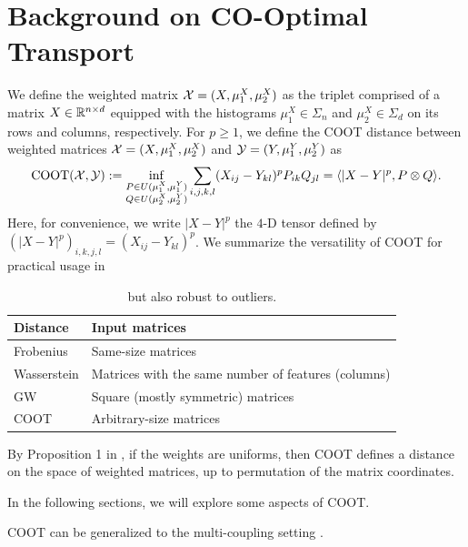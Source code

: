 \section{Background on CO-Optimal Transport}

We define the weighted matrix $\mathcal X = (X, \mu_1^X, \mu_2^X)$
as the triplet comprised of a matrix $X \in \mathbb R^{n \times d}$
equipped with the histograms $\mu_1^X \in \Sigma_n$ and $\mu_2^X \in \Sigma_d$ on its rows and columns,
respectively. For $p \geq 1$, we define the COOT distance between weighted matrices
$\mathcal X = (X, \mu_1^X, \mu_2^X)$ and $\mathcal Y = (Y, \mu_1^Y, \mu_2^Y)$ as
\begin{align}
    \text{COOT}(\mathcal X, \mathcal Y) :=
    \inf_{\substack{P \in U(\mu_1^X, \mu_1^Y) \\ Q \in U(\mu_2^X, \mu_2^Y)}}
    \sum_{i,j,k,l} (X_{ij} - Y_{kl})^p P_{ik} Q_{jl} = \langle |X - Y|^p, P \otimes Q \rangle.
\end{align}
Here, for convenience, we write $|X - Y|^p$ the $4$-D tensor defined by
$(|X - Y|^p)_{i,k,j,l} = (X_{ij} - Y_{kl})^p$. We summarize the versatility of COOT for practical
usage in 
\begin{table}[h]
	\centering
		\begin{tabular}{|l|l|}
    \hline
    Distance & Input matrices \\
    \hline
    Frobenius & Same-size matrices \\
    Wasserstein & Matrices with the same number of features (columns) \\
    GW & Square (mostly symmetric) matrices \\
    COOT & Arbitrary-size matrices \\
    \hline
		\end{tabular}
		\caption{but also robust to outliers.
    \label{t:comparisons}}
\end{table}
By Proposition 1 in \citep{Redko20}, if the weights are uniforms,
then COOT defines a distance on the space of weighted matrices,
up to permutation of the matrix coordinates.

In the following sections, we will explore some aspects of COOT.

COOT can be generalized to the multi-coupling setting \citep{Kerdoncuff22}.

